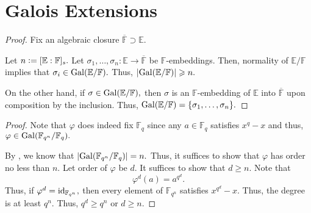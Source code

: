 \section{Galois Extensions}
\orderofgalgroup*\label{prop:orderofgalgroup2}
\begin{flushright}\hyperref[prop:orderofgalgroup]{\upsym}\end{flushright}
\begin{proof}
    Fix an algebraic closure $\overline{\mathbb{F}} \supset \mathbb{E}.$ 

    Let $n \vcentcolon= [\mathbb{E} : \mathbb{F}]_s.$ Let $\sigma_1, \ldots, \sigma_n : \mathbb{E} \to \overline{\mathbb{F}}$ be $\mathbb{F}$-embeddings. Then, normality of $\mathbb{E}/\mathbb{F}$ implies that $\sigma_i \in \operatorname{Gal}(\mathbb{E}/\mathbb{F}).$ Thus, ${\left\lvert \operatorname{Gal}(\mathbb{E}/\mathbb{F}) \right\lvert} \geqslant n.$

    On the other hand, if $\sigma \in \operatorname{Gal}(\mathbb{E}/\mathbb{F}),$ then $\sigma$ is an $\mathbb{F}$-embedding of $\mathbb{E}$ into $\overline{\mathbb{F}}$ upon composition by the inclusion. Thus, $\operatorname{Gal}(\mathbb{E}/\mathbb{F}) = \{\sigma_1, \ldots, \sigma_n\}.$
\end{proof}

\frobgenerates*\label{prop:frobgenerates2}
\begin{flushright}\hyperref[prop:frobgenerates]{\upsym}\end{flushright}
\begin{proof}
    Note that $\varphi$ does indeed fix $\mathbb{F}_q$ since any $a \in \mathbb{F}_q$ satisfies $x^q - x$ and thus, $\varphi \in \operatorname{Gal}(\mathbb{F}_{q^n}/\mathbb{F}_q).$

    By , we know that ${\left\lvert \operatorname{Gal}(\mathbb{F}_{q^n}/\mathbb{F}_q) \right\lvert} = n.$ Thus, it suffices to show that $\varphi$ has order no less than $n.$ Let order of $\varphi$ be $d.$ It suffices to show that $d \ge n.$ Note that
    \begin{equation*} 
        \varphi^d(a) = a^{q^d}.
    \end{equation*}
    Thus, if $\varphi^d = \operatorname{id}_{\mathbb{F}_{q^n}},$ then every element of $\mathbb{F}_{q^n}$ satisfies $x^{q^d} - x.$ Thus, the degree is at least $q^n.$ Thus, $q^d \ge q^n$ or $d \ge n.$
\end{proof}


